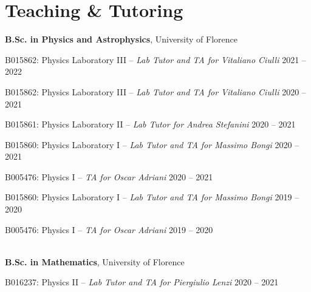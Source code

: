 \newcommand{\teaching}[2]
  {\normalsize \textbf{\color{hlcolor-0} #1}, {\color{hlcolor-1} #2}}
  
\newcommand{\teachclass}[3]
  {{\normalsize \color{maincolor} #1 --}
  {\small \color{maincolor} \emph{#2}} \hfill 
  {\normalsize \color{hlcolor-2} #3}}


\section*{Teaching \& Tutoring}
\begin{cvcontent}
  \teaching{B.Sc. in Physics and Astrophysics}{University of Florence}
  \\ [0.5mm]
  \begin{itemize*}[label=\textcolor{iconcolor}{\textbullet}]
    \item \teachclass{B015862: Physics Laboratory III}{Lab Tutor and TA for Vitaliano Ciulli}{2021 -- 2022}\\ [0.5mm]
    \item \teachclass{B015862: Physics Laboratory III}{Lab Tutor and TA for Vitaliano Ciulli}{2020 -- 2021}\\ [0.5mm]
    \item \teachclass{B015861: Physics Laboratory II}{Lab Tutor for Andrea Stefanini}{2020 -- 2021}\\ [0.5mm]
    \item \teachclass{B015860: Physics Laboratory I}{Lab Tutor and TA for Massimo Bongi}{2020 -- 2021}\\ [0.5mm]
    \item \teachclass{B005476: Physics I}{TA for Oscar Adriani}{2020 -- 2021}\\ [0.5mm]
    \item \teachclass{B015860: Physics Laboratory I}{Lab Tutor and TA for Massimo Bongi}{2019 -- 2020}\\ [0.5mm]
    \item \teachclass{B005476: Physics I}{TA for Oscar Adriani}{2019 -- 2020}
  \end{itemize*}
  \\ [3mm]
  \teaching{B.Sc. in Mathematics}{University of Florence}
  \\ [0.5mm]
  \begin{itemize*}[label=\textcolor{iconcolor}{\textbullet}]
    \item \teachclass{B016237: Physics II}{Lab Tutor and TA for Piergiulio Lenzi}{2020 -- 2021}

\end{itemize*}
\end{cvcontent}
